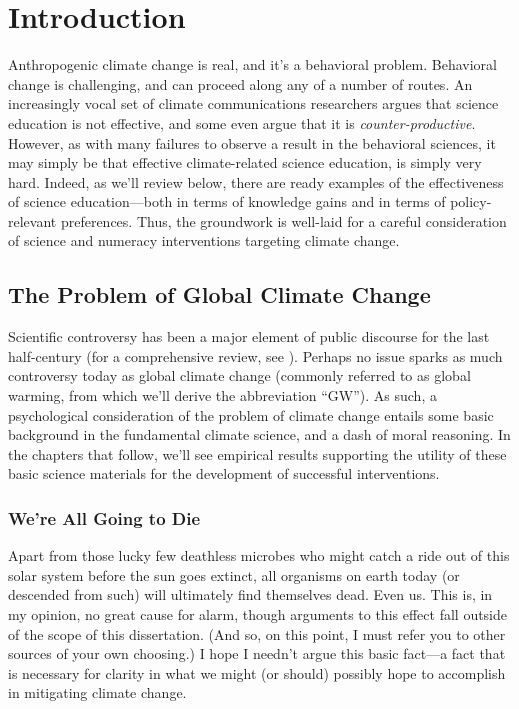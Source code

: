 \graphicspath{{intro/}}

\chapter{Introduction} \label{chap:intro}

Anthropogenic climate change is real, and it's a behavioral problem. Behavioral
change is challenging, and can proceed along any of a number of routes. An
increasingly vocal set of climate communications researchers argues that science
education is not effective, and some even argue that it is
\emph{counter-productive}.  However, as with many failures to observe a result
in the behavioral sciences, it may simply be that effective climate-related
science education, is simply very hard. Indeed, as we'll review below, there are
ready examples of the effectiveness of science education---both in terms of
knowledge gains and in terms of policy-relevant preferences. Thus, the
groundwork is well-laid for a careful consideration of science and numeracy
interventions targeting climate change.

\section{The Problem of Global Climate Change}

Scientific controversy has been a major element of public discourse for the last
half-century (for a comprehensive review, see \cite{oreskes_merchants_2010}).
Perhaps no issue sparks as much controversy today as global climate change
(commonly referred to as global warming, from which we'll derive the
abbreviation “GW”). As such, a psychological consideration of the problem of
climate change entails some basic background in the fundamental climate science,
and a dash of moral reasoning. In the chapters that follow, we'll see empirical
results supporting the utility of these basic science materials for the
development of successful interventions.

\subsection{We're All Going to Die}

Apart from those lucky few deathless microbes who might catch a ride out of this
solar system before the sun goes extinct, all organisms on earth today (or
descended from such) will ultimately find themselves dead. Even us. This is, in
my opinion, no great cause for alarm, though arguments to this effect fall
outside of the scope of this dissertation. (And so, on this point, I must refer
you to other sources of your own choosing.) I hope I needn't argue this basic
fact---a fact that is necessary for clarity in what we might (or should)
possibly hope to accomplish in mitigating climate change.

